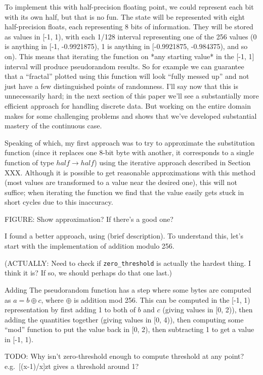 \documentclass[twocolumn]{article}
\begin{document}
To implement this with half-precision floating point, we could represent each bit with its own half, but that is no fun. The state will be represented with eight half-precision floats, each representing 8 bits of information. They will be stored as values in [-1, 1), with each 1/128 interval representing one of the 256 values (0 is anything in [-1, -0.9921875), 1 is anything in [-0.9921875, -0.984375), and so on). This means that iterating the function on *any starting value* in the [-1, 1] interval will produce pseudorandom results. So for example we can guarantee that a ``fractal'' plotted using this function will look ``fully messed up'' and not just have a few distinguished points of randomness. I'll say now that this is unnecessarily hard; in the next section of this paper we'll see a substantially more efficient approach for handling discrete data. But working on the entire domain makes for some challenging problems and shows that we've developed substantial mastery of the continuous case.

Speaking of which, my first approach was to try to approximate the substitution function (since it replaces one 8-bit byte with another, it corresponds to a single function of type $half \rightarrow half$) using the iterative approach described in Section XXX. Although it is possible to get reasonable approximations with this method (most values are transformed to a value near the desired one), this will not suffice; when iterating the function we find that the value easily gets stuck in short cycles due to this inaccuracy.

FIGURE: Show approximation? If there's a good one?

I found a better approach, using (brief description).
To understand this, let's start with the implementation of addition modulo 256.

(ACTUALLY: Need to check if \verb+zero_threshold+ is actually the hardest thing. I think it is? If so, we should perhaps do that one last.)

Adding
The pseudorandom function has a step where some bytes are computed as $a = b \oplus c$, where $\oplus$ is addition mod 256. This can be computed in the [-1, 1) representation by first
adding 1 to both of $b$ and $c$ (giving values in [0, 2)), then adding the quantities together (giving values in [0, 4)), then computing some ``mod'' function to put the value back in [0, 2), then subtracting 1 to get a value in [-1, 1).

TODO: Why isn't zero-threshold enough to compute threshold at any point? e.g.~[(x-1)/x]zt gives a threshold around 1?
\end{document}
